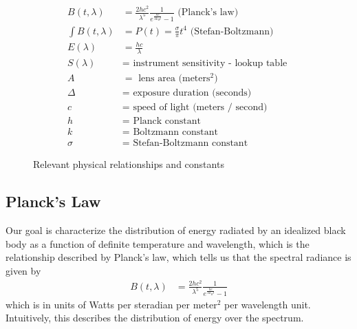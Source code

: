 \documentclass[11pt]{article}
\begin{document}
\begin{figure}[t!]
\begin{align*}
  B(t, \lambda) &= \frac{2 h c^2}{\lambda^5} \frac{1}{ e^{\frac{hc}{\lambda k_B t}} - 1} \text{ (Planck's law) } \\
  \int B(t, \lambda) &= P(t) = \frac{\sigma}{\pi} t^4  \text{ (Stefan-Boltzmann) }\\
  E(\lambda) &= \frac{hc}{\lambda} \\
  S(\lambda) &= \text{ instrument sensitivity - lookup table } \\
  A &= \text{ lens area (meters$^2$) } \\
  \Delta  &= \text{ exposure duration (seconds) } \\
  c &= \text{ speed of light (meters / second) } \\
  h &= \text{ Planck constant } \\
  k &= \text{ Boltzmann constant } \\
  \sigma &= \text{ Stefan-Boltzmann constant } 
\end{align*}
\caption{Relevant physical relationships and constants}
\end{figure}

\subsection{Planck's Law}
Our goal is characterize the distribution of energy radiated by an idealized black body as a function of definite temperature and wavelength, which is the relationship described by Planck's law, which tells us that the spectral radiance is given by
\begin{align}
  B(t, \lambda) &= \frac{2 h c^2}{\lambda^5} \frac{1}{ e^{\frac{hc}{\lambda k_B t}} - 1}
\end{align}
which is in units of Watts per steradian per meter$^2$ per wavelength unit.  Intuitively, this describes the distribution of energy over the spectrum.  
\end{document}
